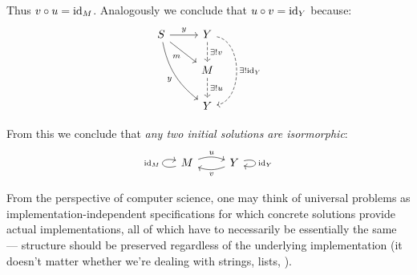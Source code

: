 Thus $v \circ u = \mathrm{id}_{ M }$. Analogously we conclude that $u \circ v = \mathrm{id}_{ Y }$
because:
$$
\begin{tikzcd}
    S \arrow[r, "y"] \arrow[rd, swap, "m"]
    \arrow[rdd, swap, bend right = 20, "y"] &
    Y \arrow[d, dashed, "\exists! v"]
    \arrow[dd, dashed, bend left = 80, "\exists! \id{Y}"] \\
    {} & M \arrow[d, dashed, "\exists! u"] \\
    {} & Y
\end{tikzcd}
$$

From this we conclude that \textit{any two initial solutions are isormorphic}:
$$
\begin{tikzcd}
    M \arrow[r, bend left = 20, "u"] \arrow[loop left, "\id{M}"] &
    Y \arrow[l, bend left = 20, "v"] \arrow[loop right, "\id{Y}"]
\end{tikzcd}
$$

From the perspective of computer science, one may think of universal problems
as implementation-independent specifications for which concrete solutions
provide actual implementations, all of which have to necessarily be
essentially the same --- structure should be preserved regardless of the
underlying implementation (it doesn't matter whether we're dealing with
strings, lists, \etc).

